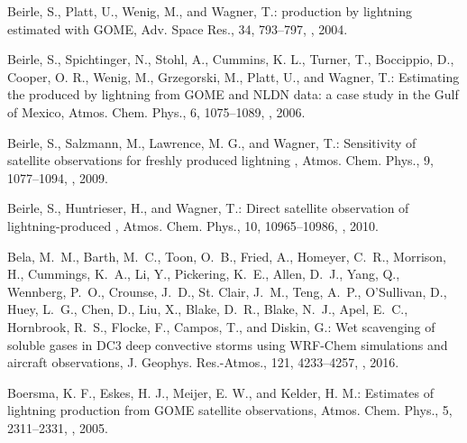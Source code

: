 \documentclass[amt]{copernicus}
\begin{document}
\begin{thebibliography}{105}
Beirle, S., Platt, U., Wenig, M., and Wagner, T.: 
  production by lightning estimated with GOME, Adv. Space Res., 34,
  793--797, , 2004.

Beirle, S., Spichtinger, N., Stohl, A., Cummins, K. L., Turner, T., Boccippio, D., Cooper, O. R., Wenig, M., Grzegorski, M., Platt, U., and Wagner, T.: Estimating the  produced by lightning from GOME and NLDN data: a case study in the Gulf of Mexico, Atmos. Chem. Phys., 6, 1075–1089, , 2006.

 Beirle, S., Salzmann, M., Lawrence, M. G., and Wagner, T.: Sensitivity of satellite observations for freshly produced lightning , Atmos. Chem. Phys., 9, 1077–1094, , 2009.

Beirle, S., Huntrieser, H., and Wagner, T.: Direct satellite observation of lightning-produced , Atmos. Chem. Phys., 10, 10965–10986, , 2010.

Bela, M.~M., Barth, M.~C., Toon, O.~B., Fried, A., Homeyer, C.~R., Morrison,
  H., Cummings, K.~A., Li, Y., Pickering, K.~E., Allen, D.~J., Yang, Q.,
  Wennberg, P.~O., Crounse, J.~D., {St. Clair}, J.~M., Teng, A.~P., O'Sullivan,
  D., Huey, L.~G., Chen, D., Liu, X., Blake, D.~R., Blake, N.~J., Apel, E.~C.,
  Hornbrook, R.~S., Flocke, F., Campos, T., and Diskin, G.: Wet scavenging of
  soluble gases in DC3 deep convective storms using WRF-Chem simulations and
  aircraft observations, J. Geophys. Res.-Atmos., 121,
  4233--4257, , 2016.

Boersma, K. F., Eskes, H. J., Meijer, E. W., and Kelder, H. M.: Estimates of lightning  production from GOME satellite observations, Atmos. Chem. Phys., 5, 2311–2331, , 2005.


\end{thebibliography}
\end{document}
